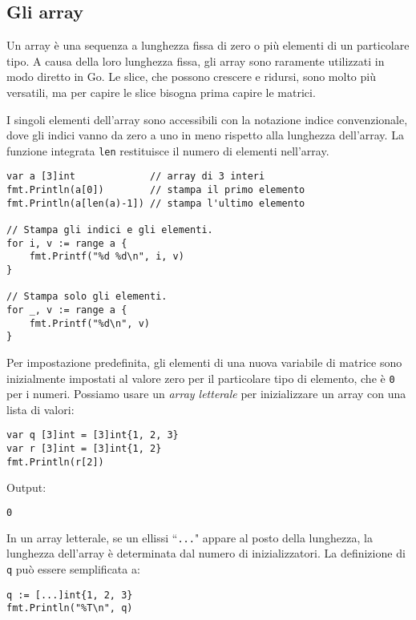 \documentclass[../../thesis.tex]{subfiles}
\begin{document}
    \subsection{Gli array}\label{subsec:gli-array}
    Un array è una sequenza a lunghezza fissa di zero o più elementi di un particolare tipo.
    A causa della loro lunghezza fissa, gli array sono raramente utilizzati in modo diretto in Go. Le slice, che possono crescere e ridursi, sono molto più versatili, ma per capire le slice bisogna prima capire le matrici.
    \hfill \vspace{12pt}

    I singoli elementi dell'array sono accessibili con la notazione indice convenzionale, dove gli indici vanno da zero a uno in meno rispetto alla lunghezza dell'array.
    La funzione integrata \verb|len| restituisce il numero di elementi nell'array.
    \begin{lstlisting}[frame = single, label = {lst:lstlisting3-1.1}]
var a [3]int             // array di 3 interi
fmt.Println(a[0])        // stampa il primo elemento
fmt.Println(a[len(a)-1]) // stampa l'ultimo elemento

// Stampa gli indici e gli elementi.
for i, v := range a {
    fmt.Printf("%d %d\n", i, v)
}

// Stampa solo gli elementi.
for _, v := range a {
    fmt.Printf("%d\n", v)
}
    \end{lstlisting}
    Per impostazione predefinita, gli elementi di una nuova variabile di matrice sono inizialmente impostati al valore zero per il particolare tipo di elemento, che è \verb|0| per i numeri.
    Possiamo usare un \textit{array letterale} per inizializzare un array con una lista di valori:
    \begin{lstlisting}[frame = single, label = {lst:lstlisting3-1.2}]
var q [3]int = [3]int{1, 2, 3}
var r [3]int = [3]int{1, 2}
fmt.Println(r[2])
    \end{lstlisting}
    Output:
    \begin{lstlisting}[language = bash, frame = L, label = {lst:lstlisting3-1.3}]
0
    \end{lstlisting}
    In un array letterale, se un ellissi ``\verb|...|" appare al posto della lunghezza, la lunghezza dell'array è determinata dal numero di inizializzatori.
    La definizione di \verb|q| può essere semplificata a:
    \begin{lstlisting}[frame = single, label = {lst:lstlisting3-1.4}]
q := [...]int{1, 2, 3}
fmt.Println("%T\n", q)
    \end{lstlisting}
\end{document}
